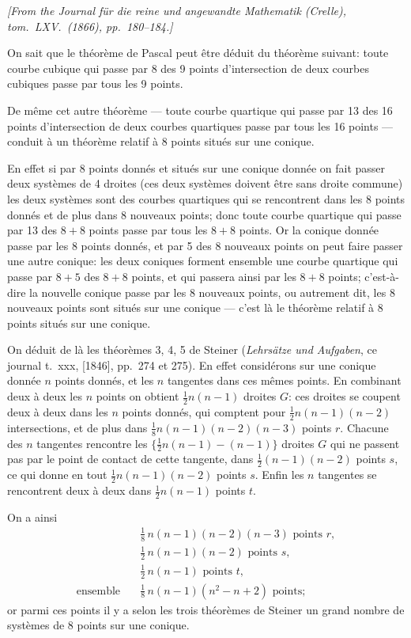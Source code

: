 \documentclass[11pt]{article}
\begin{document}
\noindent\textit{[From the \textit{Journal f\"ur die reine und angewandte Mathematik} (Crelle), tom.~LXV.~(1866), pp.~180--184.]}

\medskip

On sait que le th\'eor\`eme de Pascal peut \^etre d\'eduit du th\'eor\`eme suivant: toute courbe cubique qui passe par 8 des 9 points d'intersection de deux courbes cubiques passe par tous les 9 points.

De m\^eme cet autre th\'eor\`eme --- toute courbe quartique qui passe par 13 des 16 points d'intersection de deux courbes quartiques passe par tous les 16 points --- conduit \`a un th\'eor\`eme relatif \`a 8 points situ\'es sur une conique.

En effet si par 8 points donn\'es et situ\'es sur une conique donn\'ee on fait passer deux syst\`emes de 4 droites (ces deux syst\`emes doivent \^etre sans droite commune) les deux syst\`emes sont des courbes quartiques qui se rencontrent dans les 8 points donn\'es et de plus dans 8 nouveaux points; donc toute courbe quartique qui passe par 13 des $8+8$ points passe par tous les $8+8$ points. Or la conique donn\'ee passe par les 8 points donn\'es, et par 5 des 8 nouveaux points on peut faire passer une autre conique: les deux coniques forment ensemble une courbe quartique qui passe par $8+5$ des $8+8$ points, et qui passera ainsi par les $8+8$ points; c'est-\`a-dire la nouvelle conique passe par les 8 nouveaux points, ou autrement dit, les 8 nouveaux points sont situ\'es sur une conique --- c'est l\`a le th\'eor\`eme relatif \`a 8 points situ\'es sur une conique.

On d\'eduit de l\`a les th\'eor\`emes 3, 4, 5 de Steiner (\textit{Lehrs\"atze und Aufgaben}, ce journal t.~xxx, [1846], pp.~274 et 275). En effet consid\'erons sur une conique donn\'ee $n$ points donn\'es, et les $n$ tangentes dans ces m\^emes points. En combinant deux \`a deux les $n$ points on obtient $\tfrac{1}{2} n(n-1)$ droites $G$: ces droites se coupent deux \`a deux dans les $n$ points donn\'es, qui comptent pour $\tfrac{1}{2} n(n-1)(n-2)$ intersections, et de plus dans $\tfrac{1}{8} n(n-1)(n-2)(n-3)$ points $r$. Chacune des $n$ tangentes rencontre les $\{\tfrac{1}{2} n(n-1) - (n-1)\}$ droites $G$ qui ne passent pas par le point de contact de cette tangente, dans $\tfrac{1}{2}(n-1)(n-2)$ points $s$, ce qui donne en tout $\tfrac{1}{2} n(n-1)(n-2)$ points $s$. Enfin les $n$ tangentes se rencontrent deux \`a deux dans $\tfrac{1}{2} n(n-1)$ points $t$.

On a ainsi
\begin{align*}
& \tfrac{1}{8}\,n(n-1)(n-2)(n-3) \text{ points } r, \\
& \tfrac{1}{2}\,n(n-1)(n-2) \text{ points } s, \\
& \tfrac{1}{2}\,n(n-1) \text{ points } t, \\
\text{ensemble} \quad & \tfrac{1}{8}\,n(n-1)(n^{2}-n+2) \text{ points} ;
\end{align*}
or parmi ces points il y a selon les trois th\'eor\`emes de Steiner un grand nombre de syst\`emes de 8 points sur une conique.
\end{document}
